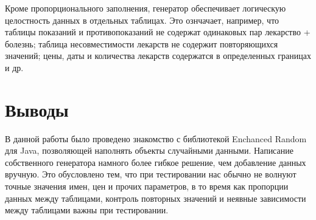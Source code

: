 \documentclass[a4paper]{article}
\begin{document}
Кроме пропорционального заполнения, генератор обеспечивает логическую целостность данных в отдельных таблицах. Это ознчачает, например, что таблицы показаний и противопоказаний не содержат одинаковых пар лекарство + болезнь; таблица несовместимости лекарств не содержит повторяющихся значений; цены, даты и количества лекарств содержатся в определенных границах и др.


\section{Выводы}
В данной работы было проведено знакомство с библиотекой Enchanced Random для Java, позволяющей наполнять объекты случайными данными. 
Написание собственного генератора намного более гибкое решение, чем добавление данных вручную. Это обусловлено тем, что при тестировании нас обычно не волнуют точные значения имен, цен и прочих параметров, в то время как пропорции данных между таблицами, контроль повторных значений и неявные зависимости между таблицами важны при тестировании.
\end{document}
